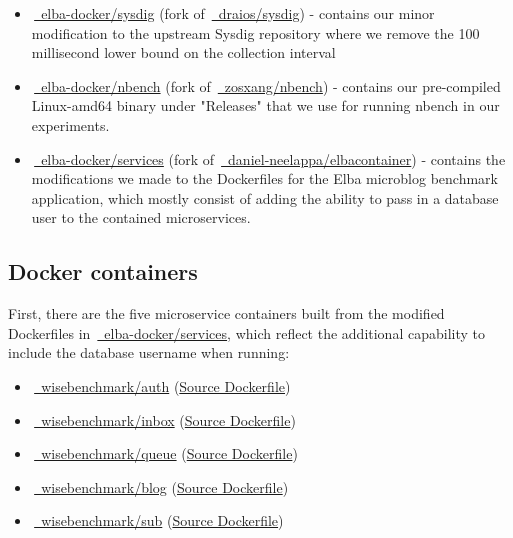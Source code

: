 \documentclass[a4paper,11pt]{article}
\newcommand{\iconDocker}{\raisebox{-0.5ex}{{\iconsfont a}}\xspace}
\newcommand{\github}[2]{\,\href{https://github.com/#1/#2}{\faGithub~#1/\linebreak[0]#2}\xspace}
\newcommand{\dockerhub}[2]{\,\href{https://hub.docker.com/repository/docker/#1/#2}{\iconDocker~#1/\linebreak[0]#2}\xspace}
\begin{document}
\begin{itemize}
    \item \github{elba-docker}{sysdig} (fork of \github{draios}{sysdig}) -
    contains our minor modification to the upstream Sysdig repository
    where we remove the 100 millisecond lower bound on the collection interval
    
    \item \github{elba-docker}{nbench} (fork of \github{zosxang}{nbench}) -
    contains our pre-compiled Linux-amd64 binary under "Releases" that we use for running nbench in our experiments.
    
    \item \github{elba-docker}{services} (fork of \github{daniel-neelappa}{elbacontainer}) -
    contains the modifications we made to the Dockerfiles for the Elba microblog benchmark application,
    which mostly consist of adding the ability to pass in a database user to the contained microservices.
\end{itemize}

\subsection{Docker containers}

First, there are the five microservice containers built from the modified Dockerfiles
in \github{elba-docker}{services},
which reflect the additional capability to include the database username when running:

\vspace{-0.3em}
\begin{itemize}
    \itemsep-0.1em 
    \item \dockerhub{wisebenchmark}{auth}
    (\href{https://github.com/elba-docker/services/blob/master/auth/dockerfile}{Source Dockerfile})
    \item \dockerhub{wisebenchmark}{inbox}
    (\href{https://github.com/elba-docker/services/blob/master/inbox/dockerfile}{Source Dockerfile})
    \item \dockerhub{wisebenchmark}{queue}
    (\href{https://github.com/elba-docker/services/blob/master/queue/dockerfile}{Source Dockerfile})
    \item \dockerhub{wisebenchmark}{blog}
    (\href{https://github.com/elba-docker/services/blob/master/blog/dockerfile}{Source Dockerfile})
    \item \dockerhub{wisebenchmark}{sub}
    (\href{https://github.com/elba-docker/services/blob/master/sub/dockerfile}{Source Dockerfile})
\end{itemize}
\end{document}
